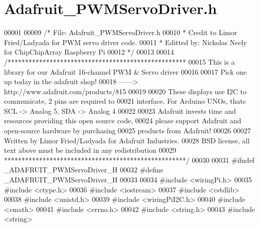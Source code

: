 \hypertarget{Adafruit__PWMServoDriver_8h_source}{\section{Adafruit\+\_\+\+P\+W\+M\+Servo\+Driver.\+h}
\label{Adafruit__PWMServoDriver_8h_source}
}

\begin{DoxyCode}
00001 
00009 \textcolor{comment}{/* File: Adafruit\_PWMServoDriver.h}
00010 \textcolor{comment}{ * Credit to Limor Fried/Ladyada for PWM servo driver code. }
00011 \textcolor{comment}{ * Editted by: Nickolas Neely for ChipChipArray Raspberry Pi }
00012 \textcolor{comment}{ */}
00013 
00014 \textcolor{comment}{/*************************************************** }
00015 \textcolor{comment}{  This is a library for our Adafruit 16-channel PWM & Servo driver}
00016 \textcolor{comment}{}
00017 \textcolor{comment}{  Pick one up today in the adafruit shop!}
00018 \textcolor{comment}{  ------> http://www.adafruit.com/products/815}
00019 \textcolor{comment}{}
00020 \textcolor{comment}{  These displays use I2C to communicate, 2 pins are required to  }
00021 \textcolor{comment}{  interface. For Arduino UNOs, thats SCL -> Analog 5, SDA -> Analog 4}
00022 \textcolor{comment}{}
00023 \textcolor{comment}{  Adafruit invests time and resources providing this open source code, }
00024 \textcolor{comment}{  please support Adafruit and open-source hardware by purchasing }
00025 \textcolor{comment}{  products from Adafruit!}
00026 \textcolor{comment}{}
00027 \textcolor{comment}{  Written by Limor Fried/Ladyada for Adafruit Industries.  }
00028 \textcolor{comment}{  BSD license, all text above must be included in any redistribution}
00029 \textcolor{comment}{ ****************************************************/}
00030 
00031 \textcolor{preprocessor}{#ifndef \_ADAFRUIT\_PWMServoDriver\_H}
00032 \textcolor{preprocessor}{#define \_ADAFRUIT\_PWMServoDriver\_H}
00033 
00034 \textcolor{preprocessor}{#include <wiringPi.h>}
00035 \textcolor{preprocessor}{#include <ctype.h>}
00036 \textcolor{preprocessor}{#include <iostream>}
00037 \textcolor{preprocessor}{#include <cstdlib>}
00038 \textcolor{preprocessor}{#include <unistd.h>}
00039 \textcolor{preprocessor}{#include <wiringPiI2C.h>}
00040 \textcolor{preprocessor}{#include <cmath>}
00041 \textcolor{preprocessor}{#include <errno.h>}
00042 \textcolor{preprocessor}{#include <string.h>}
00043 \textcolor{preprocessor}{#include <string>}

\end{DoxyCode}

